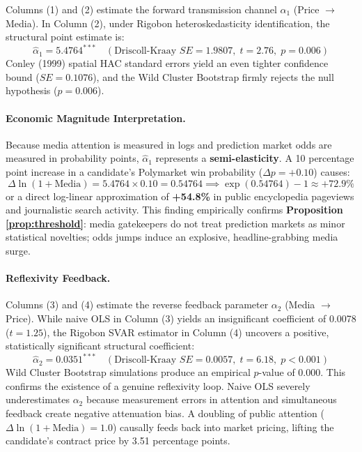 \documentclass[12pt, a4paper]{article}
\newcommand{\result}[2]{#2}
\begin{document}


Columns (1) and (2) estimate the forward transmission channel $\alpha_1$ (Price $\to$ Media). In Column (2), under Rigobon heteroskedasticity identification, the structural point estimate is:
\begin{equation}
\hat{\alpha}_1 = \result{main.alpha_1_estimate}{5.4764}^{***} \quad (\text{Driscoll-Kraay } SE = \result{main.alpha_1_dk_se}{1.9807}, \; t = 2.76, \; p = 0.006)
\end{equation}
Conley (1999) spatial HAC standard errors yield an even tighter confidence bound ($SE = 0.1076$), and the Wild Cluster Bootstrap firmly rejects the null hypothesis ($p = 0.006$). 

\paragraph{Economic Magnitude Interpretation.}
Because media attention is measured in logs and prediction market odds are measured in probability points, $\hat{\alpha}_1$ represents a \textbf{semi-elasticity}. A 10 percentage point increase in a candidate's Polymarket win probability ($\Delta p = +0.10$) causes:
\begin{equation}
\Delta \ln(1 + \text{Media}) = 5.4764 \times 0.10 = 0.54764 \implies \exp(0.54764) - 1 \approx \mathbf{+72.9\%}
\end{equation}
or a direct log-linear approximation of \textbf{+54.8\%} in public encyclopedia pageviews and journalistic search activity. This finding empirically confirms \textbf{Proposition \ref{prop:threshold}}: media gatekeepers do not treat prediction markets as minor statistical novelties; odds jumps induce an explosive, headline-grabbing media surge.

\paragraph{Reflexivity Feedback.}
Columns (3) and (4) estimate the reverse feedback parameter $\alpha_2$ (Media $\to$ Price). While naive OLS in Column (3) yields an insignificant coefficient of 0.0078 ($t = 1.25$), the Rigobon SVAR estimator in Column (4) uncovers a positive, statistically significant structural coefficient:
\begin{equation}
\hat{\alpha}_2 = \result{main.alpha_2_estimate}{0.0351}^{***} \quad (\text{Driscoll-Kraay } SE = \result{main.alpha_2_dk_se}{0.0057}, \; t = 6.18, \; p < 0.001)
\end{equation}
Wild Cluster Bootstrap simulations produce an empirical $p$-value of $0.000$. This confirms the existence of a genuine reflexivity loop. Naive OLS severely underestimates $\alpha_2$ because measurement errors in attention and simultaneous feedback create negative attenuation bias. A doubling of public attention ($\Delta \ln(1+\text{Media}) = 1.0$) causally feeds back into market pricing, lifting the candidate's contract price by 3.51 percentage points.
\end{document}
